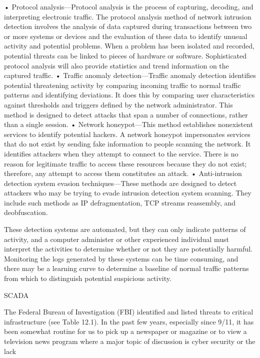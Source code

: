 \documentclass{article}
\begin{document}
• Protocol analysis---Protocol analysis is the process of capturing,
decoding, and interpreting electronic traffic. The protocol analysis
method of network intrusion detection involves the analysis of data
captured during transactions between two or more systems or devices and
the evaluation of these data to identify unusual activity and potential
problems. When a problem has been isolated and recorded, potential
threats can be linked to pieces of hardware or software. Sophisticated
protocol analysis will also provide statistics and trend information on
the captured traffic. • Traffic anomaly detection---Traffic anomaly
detection identifies potential threatening activity by comparing
incoming traffic to normal traffic patterns and identifying deviations.
It does this by comparing user characteristics against thresholds and
triggers defined by the network administrator. This method is designed
to detect attacks that span a number of connections, rather than a
single session. • Network honeypot---This method establishes nonexistent
services to identify potential hackers. A network honeypot impersonates
services that do not exist by sending fake information to people
scanning the network. It identifies attackers when they attempt to
connect to the service. There is no reason for legitimate traffic to
access these resources because they do not exist; therefore, any attempt
to access them constitutes an attack. • Anti-intrusion detection system
evasion techniques---These methods are designed to detect attackers who
may be trying to evade intrusion detection system scanning. They include
such methods as IP defragmentation, TCP streams reassembly, and
deobfuscation.

These detection systems are automated, but they can only indicate
patterns of activity, and a computer administer or other experienced
individual must interpret the activities to determine whether or not
they are potentially harmful. Monitoring the logs generated by these
systems can be time consuming, and there may be a learning curve to
determine a baseline of normal traffic patterns from which to
distinguish potential suspicious activity.

SCADA

The Federal Bureau of Investigation (FBI) identified and listed threats
to critical infrastructure (see Table 12.1). In the past few years,
especially since 9/11, it has been somewhat routine for us to pick up a
newspaper or magazine or to view a television news program where a major
topic of discussion is cyber security or the lack
\end{document}
